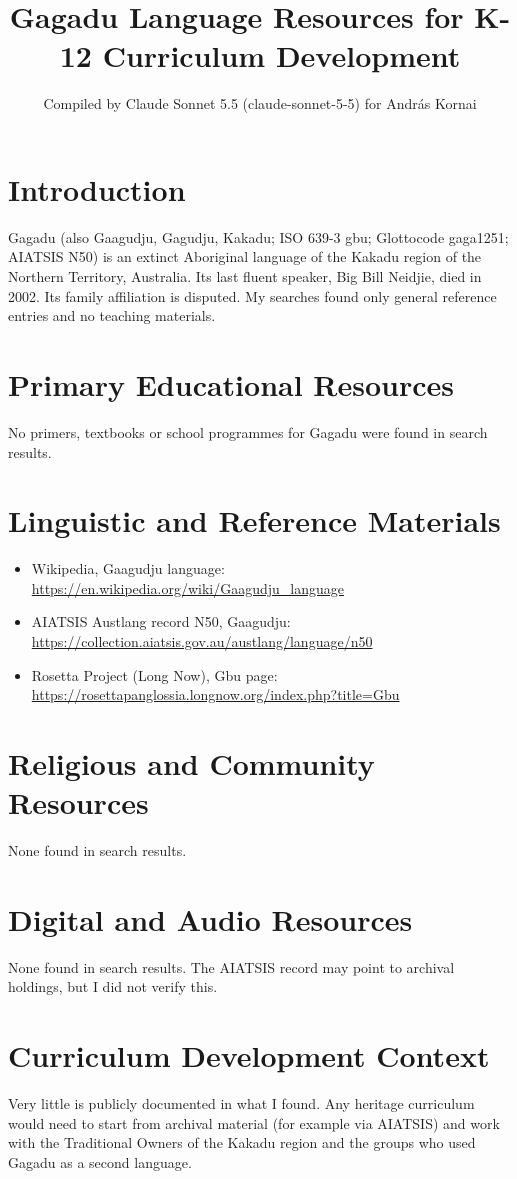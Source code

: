 \documentclass[12pt]{article}
\title{Gagadu Language Resources for K-12 Curriculum Development}
\author{Compiled by Claude Sonnet 5.5 (claude-sonnet-5-5) for Andr\'as Kornai}
\date{}
\begin{document}
\maketitle

\section{Introduction}
Gagadu (also Gaagudju, Gagudju, Kakadu; ISO 639-3 gbu; Glottocode gaga1251; AIATSIS N50) is an extinct Aboriginal language of the Kakadu region of the Northern Territory, Australia. Its last fluent speaker, Big Bill Neidjie, died in 2002. Its family affiliation is disputed. My searches found only general reference entries and no teaching materials.

\section{Primary Educational Resources}
No primers, textbooks or school programmes for Gagadu were found in search results.

\section{Linguistic and Reference Materials}
\begin{itemize}
\item Wikipedia, Gaagudju language: \url{https://en.wikipedia.org/wiki/Gaagudju_language}
\item AIATSIS Austlang record N50, Gaagudju: \url{https://collection.aiatsis.gov.au/austlang/language/n50}
\item Rosetta Project (Long Now), Gbu page: \url{https://rosettapanglossia.longnow.org/index.php?title=Gbu}
\end{itemize}

\section{Religious and Community Resources}
None found in search results.

\section{Digital and Audio Resources}
None found in search results. The AIATSIS record may point to archival holdings, but I did not verify this.

\section{Curriculum Development Context}
Very little is publicly documented in what I found. Any heritage curriculum would need to start from archival material (for example via AIATSIS) and work with the Traditional Owners of the Kakadu region and the groups who used Gagadu as a second language.
\end{document}
